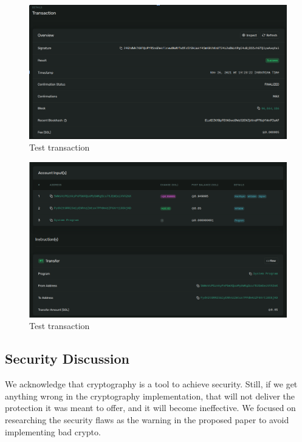 \begin{itemize}
    \begin{figure}[ht!]
        \centering
        \includegraphics[width=1\textwidth]{images/testexplore1.png}
        \caption[Test transaction]{Test transaction}
        \label{fig:testexpl1}
    \end{figure}

    \begin{figure}[ht!]
        \centering
        \includegraphics[width=1\textwidth]{images/testexplorer2.png}
        \caption[Test transaction]{Test transaction}
        \label{fig:testexpl2}
    \end{figure}

\end{itemize}

\subsection{Security Discussion}

We acknowledge that cryptography is a tool to achieve security. Still, if we get anything wrong in the cryptography implementation, that will not deliver the protection it was meant to offer, and it will become ineffective. We focused on researching the security flaws as the warning in the proposed paper to avoid implementing bad crypto.
\bigskip

